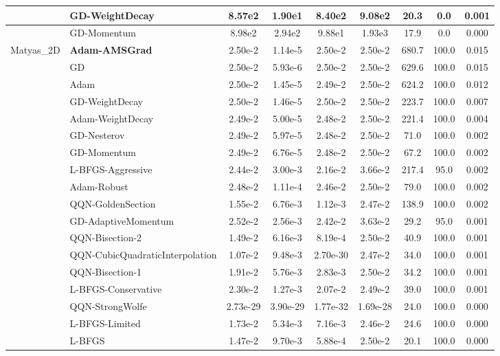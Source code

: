 \documentclass[10pt]{article}
\begin{document}
\begin{longtable}{|l|l|c|c|c|c|c|c|c|}
\hline
 & GD-WeightDecay & 8.57e2 & 1.90e1 & 8.40e2 & 9.08e2 & 20.3 & 0.0 & 0.001 \\
\hline
 & GD-Momentum & 8.98e2 & 2.94e2 & 9.88e1 & 1.93e3 & 17.9 & 0.0 & 0.000 \\
Matyas\_2D & \textbf{Adam-AMSGrad} & 2.50e-2 & 1.14e-5 & 2.50e-2 & 2.50e-2 & 680.7 & 100.0 & 0.015 \\
\hline
 & GD & 2.50e-2 & 5.93e-6 & 2.50e-2 & 2.50e-2 & 629.6 & 100.0 & 0.015 \\
\hline
 & Adam & 2.50e-2 & 1.45e-5 & 2.49e-2 & 2.50e-2 & 624.2 & 100.0 & 0.012 \\
\hline
 & GD-WeightDecay & 2.50e-2 & 1.46e-5 & 2.50e-2 & 2.50e-2 & 223.7 & 100.0 & 0.007 \\
\hline
 & Adam-WeightDecay & 2.49e-2 & 5.00e-5 & 2.48e-2 & 2.50e-2 & 221.4 & 100.0 & 0.004 \\
\hline
 & GD-Nesterov & 2.49e-2 & 5.97e-5 & 2.48e-2 & 2.50e-2 & 71.0 & 100.0 & 0.002 \\
\hline
 & GD-Momentum & 2.49e-2 & 6.76e-5 & 2.48e-2 & 2.50e-2 & 67.2 & 100.0 & 0.002 \\
\hline
 & L-BFGS-Aggressive & 2.44e-2 & 3.00e-3 & 2.16e-2 & 3.66e-2 & 217.4 & 95.0 & 0.002 \\
\hline
 & Adam-Robust & 2.48e-2 & 1.11e-4 & 2.46e-2 & 2.50e-2 & 79.0 & 100.0 & 0.002 \\
\hline
 & QQN-GoldenSection & 1.55e-2 & 6.76e-3 & 1.12e-3 & 2.47e-2 & 138.9 & 100.0 & 0.002 \\
\hline
 & GD-AdaptiveMomentum & 2.52e-2 & 2.56e-3 & 2.42e-2 & 3.63e-2 & 29.2 & 95.0 & 0.001 \\
\hline
 & QQN-Bisection-2 & 1.49e-2 & 6.16e-3 & 8.19e-4 & 2.50e-2 & 40.9 & 100.0 & 0.001 \\
\hline
 & QQN-CubicQuadraticInterpolation & 1.07e-2 & 9.48e-3 & 2.70e-30 & 2.47e-2 & 34.0 & 100.0 & 0.001 \\
\hline
 & QQN-Bisection-1 & 1.91e-2 & 5.76e-3 & 2.83e-3 & 2.50e-2 & 34.2 & 100.0 & 0.001 \\
\hline
 & L-BFGS-Conservative & 2.30e-2 & 1.27e-3 & 2.07e-2 & 2.49e-2 & 39.0 & 100.0 & 0.001 \\
\hline
 & QQN-StrongWolfe & 2.73e-29 & 3.90e-29 & 1.77e-32 & 1.69e-28 & 24.0 & 100.0 & 0.000 \\
\hline
 & L-BFGS-Limited & 1.73e-2 & 5.34e-3 & 7.16e-3 & 2.46e-2 & 24.6 & 100.0 & 0.000 \\
\hline
 & L-BFGS & 1.47e-2 & 9.70e-3 & 5.88e-4 & 2.50e-2 & 20.1 & 100.0 & 0.000 \\

\end{longtable}
\end{document}
